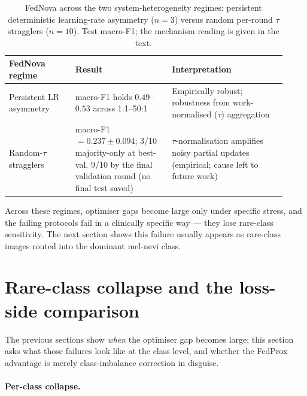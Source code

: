 \documentclass[11pt,a4paper]{report}
\begin{document}
\begin{table}[H]
\centering
\small
\caption{FedNova across the two system-heterogeneity regimes: persistent
deterministic learning-rate asymmetry ($n=3$) versus random per-round $\tau$
stragglers ($n=10$). Test macro-F1; the mechanism reading is given in the
text.}
\label{tab:fednova-regime}
\begin{tabular}{p{0.22\linewidth}p{0.32\linewidth}p{0.38\linewidth}}
\toprule
FedNova regime & Result & Interpretation \\
\midrule
Persistent LR asymmetry & macro-F1 holds $0.49$--$0.53$ across 1:1--50:1 & Empirically robust; robustness from work-normalised ($\tau$) aggregation \\
Random-$\tau$ stragglers & macro-F1 $= 0.237 \pm 0.094$; 3/10 majority-only at best-val, 9/10 by the final validation round (no final test saved) & $\tau$-normalisation amplifies noisy partial updates (empirical; cause left to future work) \\
\bottomrule
\end{tabular}
\end{table}

Across these regimes, optimiser gaps become large only under specific stress, and
the failing protocols fail in a clinically specific way --- they lose rare-class
sensitivity. The next section shows this failure usually appears as rare-class
images routed into the dominant mel-nevi class.




\section{Rare-class collapse and the loss-side comparison}
\label{sec:rare-class-collapse}

The previous sections show \emph{when} the optimiser gap becomes large; this
section asks what those failures look like at the class level, and whether the
FedProx advantage is merely class-imbalance correction in disguise.

\paragraph{Per-class collapse.}
\end{document}
